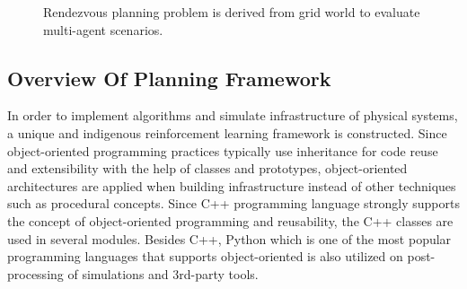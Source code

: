 \documentclass{ituphdreport}
\begin{document}
\begin{figure}[h]
	\begin{center}
	\end{center}
	\caption{Rendezvous planning problem is derived from grid world to evaluate multi-agent scenarios.
		\label{fig:rendezvous}}
\end{figure}

\subsection{Overview Of Planning Framework} \label{sec:overviewofplanningframework}
In order to implement algorithms and simulate infrastructure of physical systems, a unique and indigenous reinforcement learning framework is constructed. Since object-oriented programming practices typically use inheritance for code reuse and extensibility with the help of classes and prototypes, object-oriented architectures are applied when building infrastructure instead of other techniques such as procedural concepts. Since C++ programming language strongly supports the concept of object-oriented programming and reusability, the C++ classes are used in several modules. Besides C++, Python which is one of the most popular programming languages that supports object-oriented is also utilized on post-processing of simulations and 3rd-party tools.
\end{document}
